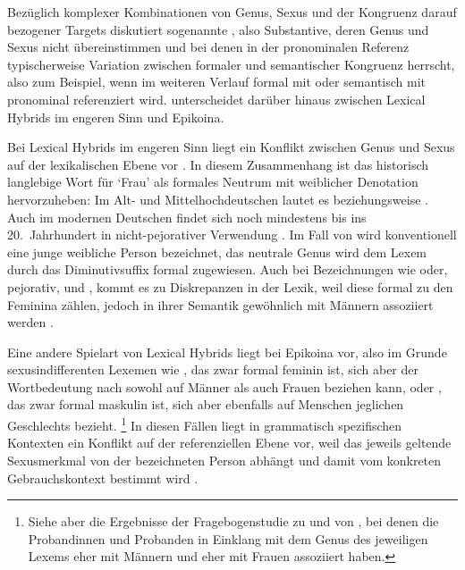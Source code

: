 Bezüglich komplexer Kombinationen von Genus, Sexus und der Kongruenz darauf
bezogener Targets diskutiert \citet[183--184]{corbett1991} sogenannte
, also Substantive, deren Genus und Sexus nicht
übereinstimmen und bei denen in der pronominalen Referenz typischerweise
Variation zwischen formaler und semantischer Kongruenz herrscht, also zum
Beispiel, wenn  im weiteren Verlauf formal mit  oder
semantisch mit  pronominal referenziert wird. \citet{klein2022}
unterscheidet darüber hinaus zwischen Lexical Hybrids im engeren Sinn und
Epikoina.

Bei Lexical Hybrids im engeren Sinn liegt ein Konflikt zwischen Genus und Sexus
auf der lexikalischen Ebene vor \autocite[145]{klein2022}. In diesem
Zusammenhang ist das historisch langlebige Wort für `Frau' als formales Neutrum
mit weiblicher Denotation hervorzuheben: Im Alt- und
Mittelhochdeutschen lautet es  beziehungsweise
. Auch im modernen Deutschen findet sich 
noch mindestens bis ins 20.~Jahrhundert in nicht-pejorativer Verwendung
\autocite[166]{fleischer2012}. Im Fall von  wird konventionell eine
junge weibliche Person bezeichnet, das neutrale Genus wird dem Lexem durch das
Diminutivsuffix  formal zugewiesen. Auch bei Bezeichnungen wie
 oder, pejorativ,  und , kommt es zu
Diskrepanzen in der Lexik, weil diese formal zu den Feminina zählen, jedoch in
ihrer Semantik gewöhnlich mit Männern assoziiert werden
\autocite[vgl.~auch][67--68]{panther2009}.

Eine andere Spielart von Lexical Hybrids liegt bei Epikoina vor, also im Grunde
sexus\-indifferenten Lexemen wie , das zwar formal feminin ist, sich
aber der Wortbedeutung nach sowohl auf Männer als auch Frauen beziehen kann,
oder , das zwar formal maskulin ist, sich aber ebenfalls auf
Menschen jeglichen Geschlechts bezieht.%
%
	\footnote{Siehe aber die Ergebnisse der Fragebogenstudie zu
		 und  von \citet[174--183]{klein2022}, bei denen
		die Probandinnen und Probanden in Einklang mit dem Genus des jeweiligen
		Lexems  eher mit Männern und  eher mit Frauen
		assoziiert haben.}
%
In diesen Fällen liegt in grammatisch spezifischen Kontexten ein Konflikt auf
der referenziellen Ebene vor, weil das jeweils geltende Sexusmerkmal von der
bezeichneten Person abhängt und damit vom konkreten Gebrauchskontext bestimmt
wird \autocite[142--144]{klein2022}.

